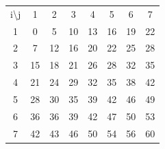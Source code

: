 \documentclass[11pt]{article} %
\begin{document}
\begin{table}[h]
\centering
\begin{tabular}{cccccccc}
i\textbackslash{}j     & 1                       & 2                       & 3                       & 4                       & 5                       & 6                       & 7                       \\ \cline{2-8}
\multicolumn{1}{c|}{1} & \multicolumn{1}{c|}{0}  & \multicolumn{1}{c|}{5}  & \multicolumn{1}{c|}{10} & \multicolumn{1}{c|}{13} & \multicolumn{1}{c|}{16} & \multicolumn{1}{c|}{19} & \multicolumn{1}{c|}{22} \\ \cline{2-8}
\multicolumn{1}{c|}{2} & \multicolumn{1}{c|}{7}  & \multicolumn{1}{c|}{12} & \multicolumn{1}{c|}{16} & \multicolumn{1}{c|}{20} & \multicolumn{1}{c|}{22} & \multicolumn{1}{c|}{25} & \multicolumn{1}{c|}{28} \\ \cline{2-8}
\multicolumn{1}{c|}{3} & \multicolumn{1}{c|}{15} & \multicolumn{1}{c|}{18} & \multicolumn{1}{c|}{21} & \multicolumn{1}{c|}{26} & \multicolumn{1}{c|}{28} & \multicolumn{1}{c|}{32} & \multicolumn{1}{c|}{35} \\ \cline{2-8}
\multicolumn{1}{c|}{4} & \multicolumn{1}{c|}{21} & \multicolumn{1}{c|}{24} & \multicolumn{1}{c|}{29} & \multicolumn{1}{c|}{32} & \multicolumn{1}{c|}{35} & \multicolumn{1}{c|}{38} & \multicolumn{1}{c|}{42} \\ \cline{2-8}
\multicolumn{1}{c|}{5} & \multicolumn{1}{c|}{28} & \multicolumn{1}{c|}{30} & \multicolumn{1}{c|}{35} & \multicolumn{1}{c|}{39} & \multicolumn{1}{c|}{42} & \multicolumn{1}{c|}{46} & \multicolumn{1}{c|}{49} \\ \cline{2-8}
\multicolumn{1}{c|}{6} & \multicolumn{1}{c|}{36} & \multicolumn{1}{c|}{36} & \multicolumn{1}{c|}{39} & \multicolumn{1}{c|}{42} & \multicolumn{1}{c|}{47} & \multicolumn{1}{c|}{50} & \multicolumn{1}{c|}{53} \\ \cline{2-8}
\multicolumn{1}{c|}{7} & \multicolumn{1}{c|}{42} & \multicolumn{1}{c|}{43} & \multicolumn{1}{c|}{46} & \multicolumn{1}{c|}{50} & \multicolumn{1}{c|}{54} & \multicolumn{1}{c|}{56} & \multicolumn{1}{c|}{60} \\ \cline{2-8}
\end{tabular}
\end{table}
\end{document}
